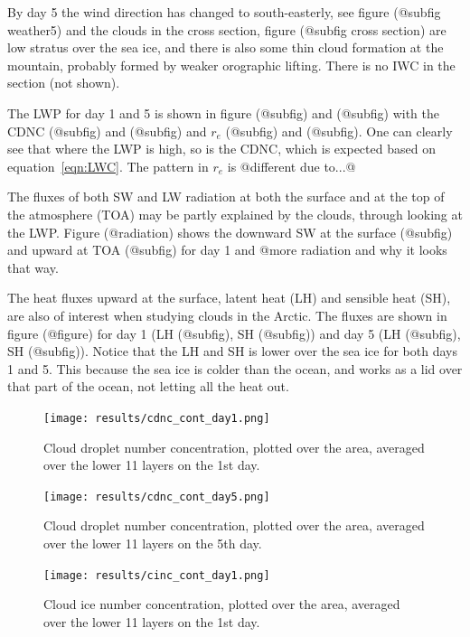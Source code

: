 By day 5 the wind direction has changed to south-easterly, see figure (@subfig weather5) and the clouds in the cross section, figure (@subfig cross section) are low stratus over the sea ice, and there is also some thin cloud formation at the mountain, probably formed by weaker orographic lifting. There is no IWC in the section (not shown).

The LWP for day 1 and 5 is shown in figure (@subfig) and (@subfig) with the CDNC (@subfig) and (@subfig) and $r_e$ (@subfig) and (@subfig). One can clearly see that where the LWP is high, so is the CDNC, which is expected based on equation~\ref{eqn:LWC}. The pattern in $r_e$ is @different due to...@

The fluxes of both SW and LW radiation at both the surface and at the top of the atmosphere (TOA) may be partly explained by the clouds, through looking at the LWP. Figure (@radiation) shows the downward SW at the surface (@subfig) and upward at TOA (@subfig) for day 1 and @more radiation and why it looks that way.

The heat fluxes upward at the surface, latent heat (LH) and sensible heat (SH), are also of interest when studying clouds in the Arctic. The fluxes are shown in figure (@figure) for day 1 (LH (@subfig), SH (@subfig)) and day 5 (LH (@subfig), SH (@subfig)). Notice that the LH and SH is lower over the sea ice for both days 1 and 5. This because the sea ice is colder than the ocean, and works as a lid over that part of the ocean, not letting all the heat out.

\begin{figure}[h]
\centering
\texttt{[image: results/cdnc\_cont\_day1.png]}
\caption{Cloud droplet number concentration, plotted over the area, averaged over the lower 11 layers on the 1st day.}
\label{fig:cdnc_cont_Day1}
\end{figure}

\begin{figure}[h]
\centering
\texttt{[image: results/cdnc\_cont\_day5.png]}
\caption{Cloud droplet number concentration, plotted over the area, averaged over the lower 11 layers on the 5th day.}
\label{fig:cdnc_cont_Day5}
\end{figure}

\begin{figure}[h]
\centering
\texttt{[image: results/cinc\_cont\_day1.png]}
\caption{Cloud ice number concentration, plotted over the area, averaged over the lower 11 layers on the 1st day.}
\label{fig:cinc_cont_Day1}
\end{figure}

